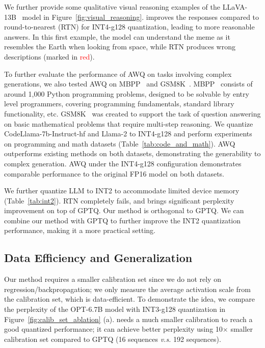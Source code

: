 We further provide some qualitative visual reasoning examples of the LLaVA-13B~\cite{liu2023llava} model in Figure~\ref{fig:visual_reasoning}. \methodshort improves the responses compared to round-to-nearest (RTN) for INT4-g128 quantization, leading to more reasonable answers. In this first example, the \methodshort model can understand the meme as it resembles the Earth when looking from space, while RTN produces wrong descriptions (marked in \textcolor{red}{red}). %

To further evaluate the performance of AWQ on tasks involving complex generations, we also tested AWQ on MBPP~\cite{austin2021program} and GSM8K~\cite{cobbe2021training}. MBPP~\cite{austin2021program} consists of around 1,000 Python programming problems, designed to be solvable by entry level programmers, covering programming fundamentals, standard library functionality, etc. GSM8K~\cite{cobbe2021training} was created to support the task of question answering on basic mathematical problems that require multi-step reasoning. We quantize CodeLlama-7b-Instruct-hf and Llama-2 to INT4-g128 and perform experiments on programming and math datasets (Table~\ref{tab:code_and_math}). AWQ outperforms existing methods on both datasets, demonstrating the generability to complex generation. AWQ under the INT4-g128 configuration demonstrates comparable
performance to the original FP16 model on both datasets.

We further quantize LLM to INT2 to accommodate limited device memory (Table~\ref{tab:int2}). RTN completely fails, and \methodshort brings significant perplexity improvement on top of GPTQ.%
Our method is orthogonal to GPTQ.
We can combine our method with GPTQ to further improve the INT2 quantization performance, making it a more practical setting. 

\subsection{Data Efficiency and Generalization}
\label{sec:ablation_study}
 Our method requires a smaller calibration set since we do not rely on regression/backpropagation; we only measure the average activation scale from the calibration set, which is data-efficient.
To demonstrate the idea, we compare the perplexity of the OPT-6.7B model with INT3-g128 quantization in Figure~\ref{fig:calib_set_ablation} (a). \methodshort needs a much smaller calibration to reach a good quantized performance; it can achieve better perplexity using 10$\times$ smaller calibration set compared to GPTQ (16 sequences \emph{v.s.} 192 sequences).


